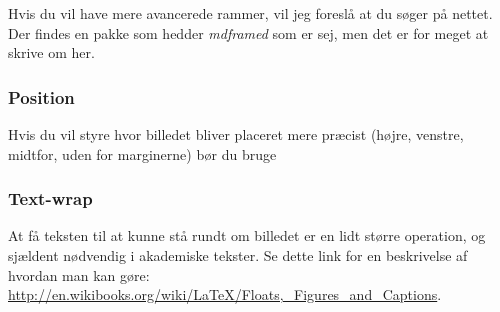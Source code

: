 \noindent
Hvis du vil have mere avancerede rammer, vil jeg foreslå at du søger på nettet. Der findes en pakke som hedder \emph{mdframed} som er sej, men det er for meget at skrive om her.

\subsubsection{Position}
Hvis du vil styre hvor billedet bliver placeret mere præcist (højre, venstre, midtfor, uden for marginerne) bør du bruge 

\subsubsection{Text-wrap}
At få teksten til at kunne stå rundt om billedet er en lidt større operation, og sjældent nødvendig i akademiske tekster. Se dette link for en beskrivelse af hvordan man kan gøre: \url{http://en.wikibooks.org/wiki/LaTeX/Floats,_Figures_and_Captions}.